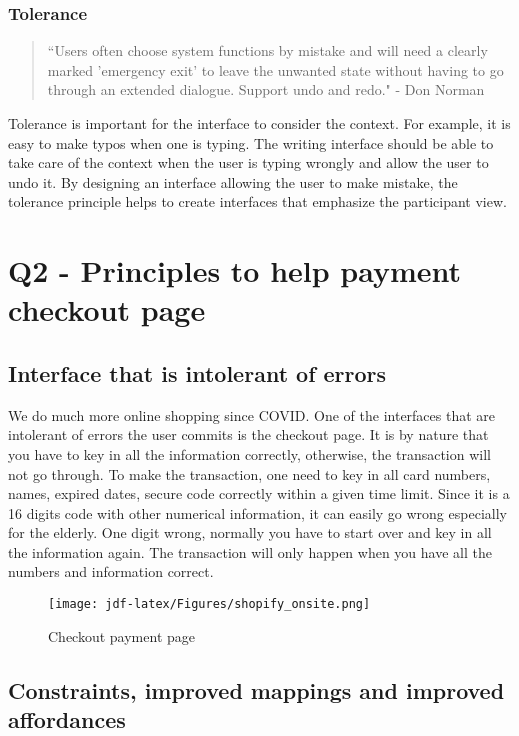 \documentclass[
	letterpaper, %
]{jdf}
\begin{document}
\subsubsection{Tolerance}
\begin{quotation}
\noindent “Users often choose system functions by mistake and will need a clearly marked 'emergency exit' to leave the unwanted state without having to go through an extended dialogue. Support undo and redo."
- Don Norman
\end{quotation}

Tolerance is important for the interface to consider the context. For example, it is easy to make typos when one is typing. The writing interface should be able to take care of the context when the user is typing wrongly and allow the user to undo it. By designing an interface allowing the user to make mistake, the tolerance principle helps to create interfaces that emphasize the participant view.

\section{Q2 - Principles to help payment checkout page}
\subsection{Interface that is intolerant of errors}
We do much more online shopping since COVID. One of the interfaces that are intolerant of errors the user commits is the checkout page. It is by nature that you have to key in all the information correctly, otherwise, the transaction will not go through. To make the transaction, one need to key in all card numbers, names, expired dates, secure code correctly within a given time limit. Since it is a 16 digits code with other numerical information, it can easily go wrong especially for the elderly. One digit wrong, normally you have to start over and key in all the information again. The transaction will only happen when you have all the numbers and information correct.

\begin{figure}[h]
	\centering
	\texttt{[image: jdf-latex/Figures/shopify\_onsite.png]}
	\caption{Checkout payment page}
	\label{fig:shopify_onsite}
\end{figure}

\subsection{Constraints, improved mappings and improved affordances}
\end{document}
